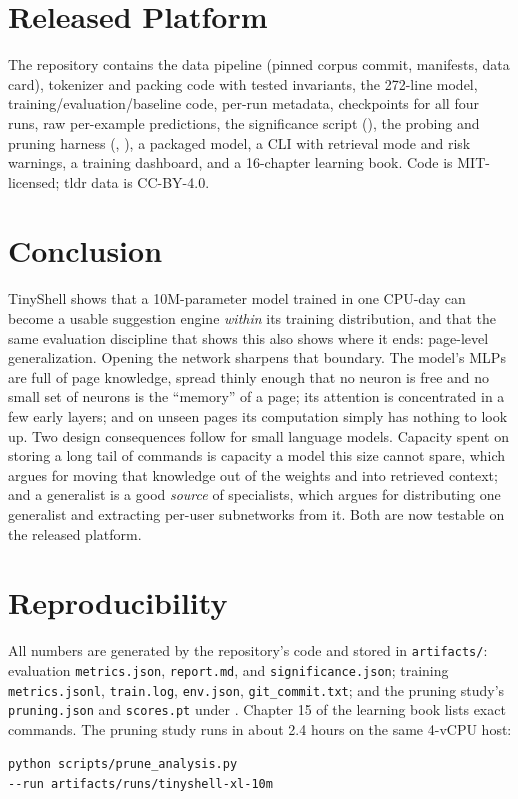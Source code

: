 \documentclass[11pt,a4paper]{article}
\newcommand{\modelname}{TinyShell}
\begin{document}
\section{Released Platform}
\label{sec:platform}

The repository contains the data pipeline (pinned corpus commit, manifests,
data card), tokenizer and packing code with tested invariants, the 272-line
model, training/evaluation/baseline code, per-run metadata, checkpoints for
all four runs, raw per-example predictions, the significance script
(), the probing and pruning harness
(, ), a
packaged model, a CLI with retrieval mode and risk warnings, a training
dashboard, and a 16-chapter learning book. Code is MIT-licensed; tldr data
is CC-BY-4.0.

\section{Conclusion}

\modelname{} shows that a 10M-parameter model trained in one CPU-day can become
a usable suggestion engine \emph{within} its training distribution, and that
the same evaluation discipline that shows this also shows where it ends:
page-level generalization. Opening the network sharpens that boundary.
The model's MLPs are full of page knowledge, spread thinly enough that no
neuron is free and no small set of neurons is the ``memory'' of a page; its
attention is concentrated in a few early layers; and on unseen pages its
computation simply has nothing to look up. Two design consequences follow
for small language models. Capacity spent on storing a long tail of
commands is capacity a model this size cannot spare, which argues for
moving that knowledge out of the weights and into retrieved context; and a
generalist is a good \emph{source} of specialists, which argues for
distributing one generalist and extracting per-user subnetworks from it.
Both are now testable on the released platform.

\section*{Reproducibility}
\begin{sloppypar}
All numbers are generated by the repository's code and stored in
\texttt{artifacts/}: evaluation \texttt{metrics.json}, \texttt{report.md},
and \texttt{significance.json}; training \texttt{metrics.jsonl},
\texttt{train.log}, \texttt{env.json}, \texttt{git\_commit.txt}; and the
pruning study's \texttt{pruning.json} and \texttt{scores.pt} under
. Chapter 15 of the learning book lists exact commands.
The pruning study runs in about 2.4 hours on the same 4-vCPU host:
\end{sloppypar}
\begin{center}
\texttt{python scripts/prune\_analysis.py}\\
\texttt{-{}-run artifacts/runs/tinyshell-xl-10m}
\end{center}
\end{document}
